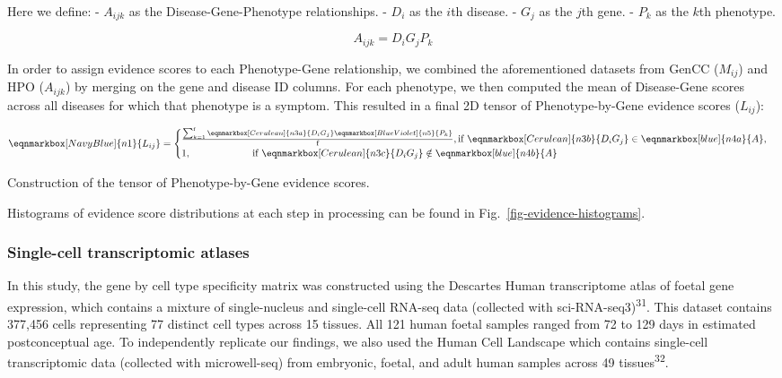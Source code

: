 \documentclass[
]{agujournal2019}
\begin{document}
Here we define: - \(A_{ijk}\) as the Disease-Gene-Phenotype
relationships. - \(D_i\) as the \(i\)th disease. - \(G_j\) as the
\(j\)th gene. - \(P_k\) as the \(k\)th phenotype.

\[
A_{ijk} = D_i G_j P_k
\]

In order to assign evidence scores to each Phenotype-Gene relationship,
we combined the aforementioned datasets from GenCC (\(M_{ij}\)) and HPO
(\(A_{ijk}\)) by merging on the gene and disease ID columns. For each
phenotype, we then computed the mean of Disease-Gene scores across all
diseases for which that phenotype is a symptom. This resulted in a final
2D tensor of Phenotype-by-Gene evidence scores (\(L_{ij}\)):

\hfill\break
\hfill\break

$$
 \eqnmarkbox[NavyBlue]{n1}{ L_{ij} } = 
 \begin{cases}
  \frac{\sum_{k=1}^{\text{f}} 
    \eqnmarkbox[Cerulean]{n3a}{D_i G_j} 
    \eqnmarkbox[BlueViolet]{n5}{P_k} 
    }{\text{f}}, 
  \text{if } \eqnmarkbox[Cerulean]{n3b}{D_i G_j} 
    \in \eqnmarkbox[blue]{n4a}{A},
  \\
  1, \hspace{2.2cm}
  \text{if } \eqnmarkbox[Cerulean]{n3c}{D_i G_j} 
    \notin\eqnmarkbox[blue]{n4b}{A}
 \end{cases}
$$

\hfill\break

Construction of the tensor of Phenotype-by-Gene evidence scores.

\hfill\break

Histograms of evidence score distributions at each step in processing
can be found in Fig.~\ref{fig-evidence-histograms}.

\subsubsection{Single-cell transcriptomic
atlases}\label{single-cell-transcriptomic-atlases}

In this study, the gene by cell type specificity matrix was constructed
using the Descartes Human transcriptome atlas of foetal gene expression,
which contains a mixture of single-nucleus and single-cell RNA-seq data
(collected with sci-RNA-seq3)\textsuperscript{31}. This dataset contains
377,456 cells representing 77 distinct cell types across 15 tissues. All
121 human foetal samples ranged from 72 to 129 days in estimated
postconceptual age. To independently replicate our findings, we also
used the Human Cell Landscape which contains single-cell transcriptomic
data (collected with microwell-seq) from embryonic, foetal, and adult
human samples across 49 tissues\textsuperscript{32}.
\end{document}
